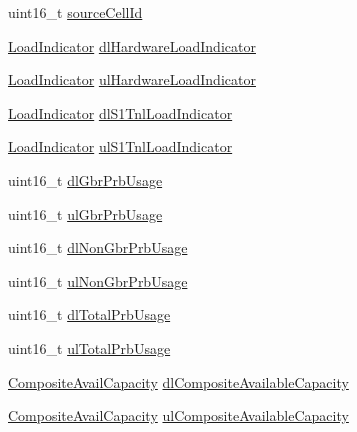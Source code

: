 \begin{DoxyCompactItemize}
\item 
uint16\+\_\+t \hyperlink{structns3_1_1EpcX2Sap_1_1CellMeasurementResultItem_a3934153121f267e41f5eee6bba8c3136}{source\+Cell\+Id}
\item 
\hyperlink{classns3_1_1EpcX2Sap_a5de1a139dac453e4a55347721a8fc76f}{Load\+Indicator} \hyperlink{structns3_1_1EpcX2Sap_1_1CellMeasurementResultItem_a38693c4a17eec3f1d01fe58b79da31fb}{dl\+Hardware\+Load\+Indicator}
\item 
\hyperlink{classns3_1_1EpcX2Sap_a5de1a139dac453e4a55347721a8fc76f}{Load\+Indicator} \hyperlink{structns3_1_1EpcX2Sap_1_1CellMeasurementResultItem_a09b11bcf3371c2776c606b8d14b3158f}{ul\+Hardware\+Load\+Indicator}
\item 
\hyperlink{classns3_1_1EpcX2Sap_a5de1a139dac453e4a55347721a8fc76f}{Load\+Indicator} \hyperlink{structns3_1_1EpcX2Sap_1_1CellMeasurementResultItem_a5125fc669670c8fa35b5dd432a0a1a2a}{dl\+S1\+Tnl\+Load\+Indicator}
\item 
\hyperlink{classns3_1_1EpcX2Sap_a5de1a139dac453e4a55347721a8fc76f}{Load\+Indicator} \hyperlink{structns3_1_1EpcX2Sap_1_1CellMeasurementResultItem_ac75b8585b28aae3baedb9b2c92ad8b57}{ul\+S1\+Tnl\+Load\+Indicator}
\item 
uint16\+\_\+t \hyperlink{structns3_1_1EpcX2Sap_1_1CellMeasurementResultItem_abe33cf95f6f5f8d0c29fb51dbd983f7f}{dl\+Gbr\+Prb\+Usage}
\item 
uint16\+\_\+t \hyperlink{structns3_1_1EpcX2Sap_1_1CellMeasurementResultItem_a3d827a749b6ccfbfad51279bad030b64}{ul\+Gbr\+Prb\+Usage}
\item 
uint16\+\_\+t \hyperlink{structns3_1_1EpcX2Sap_1_1CellMeasurementResultItem_af501e163c68e335ab1f33281a0906c57}{dl\+Non\+Gbr\+Prb\+Usage}
\item 
uint16\+\_\+t \hyperlink{structns3_1_1EpcX2Sap_1_1CellMeasurementResultItem_a779dc6bb9d8b0dd3b94aa529da6585ae}{ul\+Non\+Gbr\+Prb\+Usage}
\item 
uint16\+\_\+t \hyperlink{structns3_1_1EpcX2Sap_1_1CellMeasurementResultItem_a44953c4e946df2402624cb3f6ceefa1b}{dl\+Total\+Prb\+Usage}
\item 
uint16\+\_\+t \hyperlink{structns3_1_1EpcX2Sap_1_1CellMeasurementResultItem_a05cabbc63cbdcab81b23ff67b08695a2}{ul\+Total\+Prb\+Usage}
\item 
\hyperlink{structns3_1_1EpcX2Sap_1_1CompositeAvailCapacity}{Composite\+Avail\+Capacity} \hyperlink{structns3_1_1EpcX2Sap_1_1CellMeasurementResultItem_a79a70e010525f6dba1a7cbcd2c30450b}{dl\+Composite\+Available\+Capacity}
\item 
\hyperlink{structns3_1_1EpcX2Sap_1_1CompositeAvailCapacity}{Composite\+Avail\+Capacity} \hyperlink{structns3_1_1EpcX2Sap_1_1CellMeasurementResultItem_a818786b94b85651dba596ea93f9f2f9d}{ul\+Composite\+Available\+Capacity}
\end{DoxyCompactItemize}


